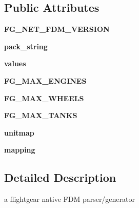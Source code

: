 \subsection*{Public Attributes}
\begin{DoxyCompactItemize}
\item 
\mbox{\label{classpymavlink_1_1fgFDM_1_1fgFDM_a9da6cc96e73c70f448aa0e47f831abe4}} 
{\bfseries F\+G\+\_\+\+N\+E\+T\+\_\+\+F\+D\+M\+\_\+\+V\+E\+R\+S\+I\+ON}
\item 
\mbox{\label{classpymavlink_1_1fgFDM_1_1fgFDM_a1dc96e0247dd5d40de4108f7aecadcc5}} 
{\bfseries pack\+\_\+string}
\item 
\mbox{\label{classpymavlink_1_1fgFDM_1_1fgFDM_a77870d99ab6aedd39276f1a008e790a7}} 
{\bfseries values}
\item 
\mbox{\label{classpymavlink_1_1fgFDM_1_1fgFDM_ad756860723bcc8899b72df6596798e49}} 
{\bfseries F\+G\+\_\+\+M\+A\+X\+\_\+\+E\+N\+G\+I\+N\+ES}
\item 
\mbox{\label{classpymavlink_1_1fgFDM_1_1fgFDM_a56f932135f71445c9e0627abe4db8360}} 
{\bfseries F\+G\+\_\+\+M\+A\+X\+\_\+\+W\+H\+E\+E\+LS}
\item 
\mbox{\label{classpymavlink_1_1fgFDM_1_1fgFDM_a877a5b1c7125f4f3a343855eecee4722}} 
{\bfseries F\+G\+\_\+\+M\+A\+X\+\_\+\+T\+A\+N\+KS}
\item 
\mbox{\label{classpymavlink_1_1fgFDM_1_1fgFDM_a460d76fcf614539c171770108ed83756}} 
{\bfseries unitmap}
\item 
\mbox{\label{classpymavlink_1_1fgFDM_1_1fgFDM_ad1c72a439d291c91cc90d1f4f091a78b}} 
{\bfseries mapping}
\end{DoxyCompactItemize}


\subsection{Detailed Description}
\begin{DoxyVerb}a flightgear native FDM parser/generator\end{DoxyVerb}
 

